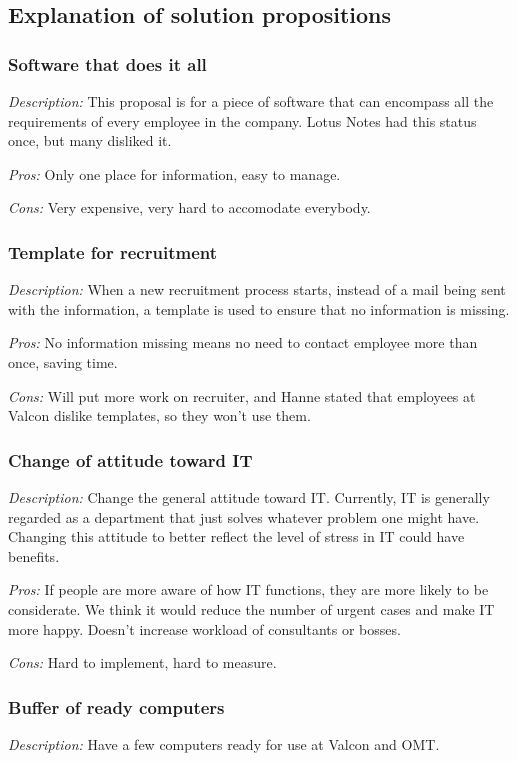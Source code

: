 \subsection{Explanation of solution propositions}
\subsubsection{Software that does it all}
\emph{Description:} This proposal is for a piece of software that can encompass all the requirements of every employee in the company. Lotus Notes had this status once, but many disliked it.

\noindent \emph{Pros:} Only one place for information, easy to manage.

\noindent \emph{Cons:} Very expensive, very hard to accomodate everybody.

\subsubsection{Template for recruitment}
\emph{Description:} When a new recruitment process starts, instead of a mail being sent with the information, a template is used to ensure that no information is missing.

\noindent \emph{Pros:} No information missing means no need to contact employee more than once, saving time.

\noindent \emph{Cons:} Will put more work on recruiter, and Hanne stated that employees at Valcon dislike templates, so they won't use them.

\subsubsection{Change of attitude toward IT}
\emph{Description:} Change the general attitude toward IT. Currently, IT is generally regarded as a department that just solves whatever problem one might have. Changing this attitude to better reflect the level of stress in IT could have benefits.

\noindent \emph{Pros:} If people are more aware of how IT functions, they are more likely to be considerate. We think it would reduce the number of urgent cases and make IT more happy. Doesn't increase workload of consultants or bosses.

\noindent \emph{Cons:} Hard to implement, hard to measure.

\subsubsection{Buffer of ready computers}
\emph{Description:} Have a few computers ready for use at Valcon and OMT.

